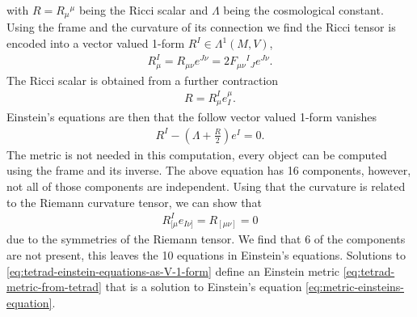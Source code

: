 \documentclass[10pt]{report}
\theoremstyle{definition}
\begin{document}
with $R = R_\mu{}^\mu$ being the Ricci scalar and $\Lambda$ being the cosmological constant. Using the frame and the curvature of its connection we find the Ricci tensor is encoded into a vector valued 1-form $R^I \in \Lambda^1(M,V)$,
\begin{align}
    R^I_\mu = R_{\mu\nu} e^{J\nu} = 2 F_{\mu\nu}{}^I{}_J e^{J\nu}.
\end{align}
The Ricci scalar is obtained from a further contraction 
\begin{align}
    R = R^I_\mu e^\mu_I.
\end{align}
Einstein's equations are then that the follow vector valued 1-form vanishes
\begin{align}
    R^I - \left(\Lambda + \frac{R}{2} \right) e^I = 0. \label{eq:tetrad-einstein-equations-as-V-1-form}
\end{align}
The metric is not needed in this computation, every object can be computed using the frame and its inverse. The above equation has 16 components, however, not all of those components are independent. Using that the curvature is related to the Riemann curvature tensor, we can show that
\begin{align}
    R^I_{[\mu} e_{I\nu]} = R_{[\mu\nu]} = 0
\end{align}
due to the symmetries of the Riemann tensor. We find that 6 of the components are not present, this leaves the 10 equations in Einstein's equations. Solutions to \cref{eq:tetrad-einstein-equations-as-V-1-form} define an Einstein metric \cref{eq:tetrad-metric-from-tetrad} that is a solution to Einstein's equation \cref{eq:metric-einsteins-equation}.
\end{document}
